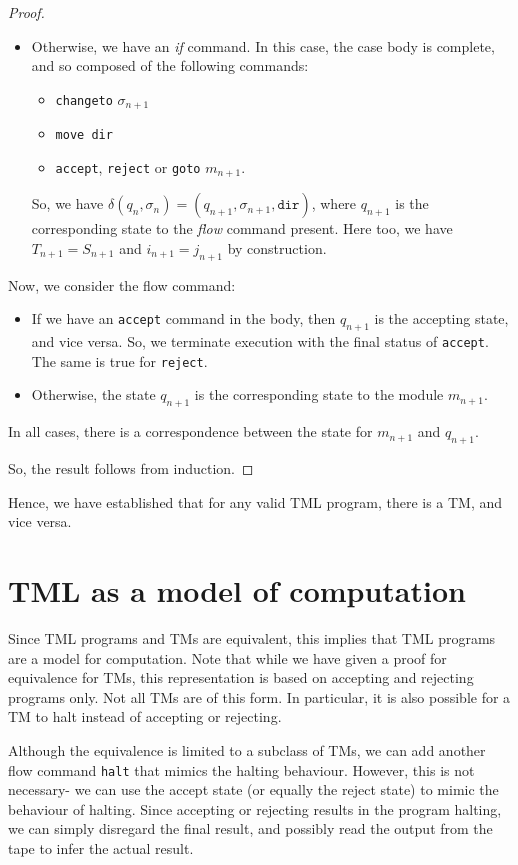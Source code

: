 \begin{appendices}
\begin{proof}
\begin{itemize}
\begin{itemize}
            \item Otherwise, we have an \textit{if} command. In this case, the case body is complete, and so composed of the following commands:
            \begin{itemize}
                \item \texttt{changeto} $\sigma_{n+1}$
                \item \texttt{move dir}
                \item \texttt{accept}, \texttt{reject} or \texttt{goto} $m_{n+1}$.
            \end{itemize}
            So, we have $\delta(q_n, \sigma_n) = (q_{n+1}, \sigma_{n+1}, \texttt{dir})$, where $q_{n+1}$ is the corresponding state to the \textit{flow} command present. Here too, we have $T_{n+1} = S_{n+1}$ and $i_{n+1} = j_{n+1}$ by construction. 
        \end{itemize}
        Now, we consider the flow command:
        \begin{itemize}
            \item If we have an \texttt{accept} command in the body, then $q_{n+1}$ is the accepting state, and vice versa. So, we terminate execution with the final status of \texttt{accept}. The same is true for \texttt{reject}. 
            \item Otherwise, the state $q_{n+1}$ is the corresponding state to the module $m_{n+1}$.
        \end{itemize}
        In all cases, there is a correspondence between the state for $m_{n+1}$ and $q_{n+1}$.   
    \end{itemize}
    So, the result follows from induction.
\end{proof}

Hence, we have established that for any valid TML program, there is a TM, and vice versa.

\section{TML as a model of computation}
Since TML programs and TMs are equivalent, this implies that TML programs are a model for computation. Note that while we have given a proof for equivalence for TMs, this representation is based on accepting and rejecting programs only. Not all TMs are of this form. In particular, it is also possible for a TM to halt instead of accepting or rejecting.

Although the equivalence is limited to a subclass of TMs, we can add another flow command \texttt{halt} that mimics the halting behaviour. However, this is not necessary- we can use the accept state (or equally the reject state) to mimic the behaviour of halting. Since accepting or rejecting results in the program halting, we can simply disregard the final result, and possibly read the output from the tape to infer the actual result.


\end{appendices}
